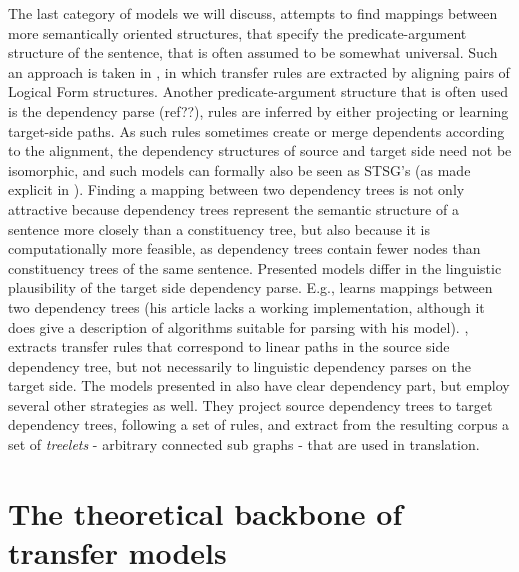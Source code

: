 \documentclass{report}
\theoremstyle{definition}
\theoremstyle{plain}
\begin{document}
The last category of models we will discuss, attempts to find mappings between more semantically oriented structures, that specify the predicate-argument structure of the sentence, that is often assumed to be somewhat universal. Such an approach is taken in \cite{menezes2003best}, in which transfer rules are extracted by aligning pairs of Logical Form structures. Another predicate-argument structure that is often used is the dependency parse (ref??), rules are inferred by either projecting or learning target-side paths. As such rules sometimes create or merge dependents according to the alignment, the dependency structures of source and target side need not be isomorphic, and such models can formally also be seen as STSG's (as made explicit in \cite{eisner2003learning}). Finding a mapping between two dependency trees is not only attractive because dependency trees represent the semantic structure of a sentence more closely than a constituency tree, but also because it is computationally more feasible, as dependency trees contain fewer nodes than constituency trees of the same sentence. Presented models differ in the linguistic plausibility of the target side dependency parse. E.g., \cite{eisner2003learning} learns mappings between two dependency trees (his article lacks a working implementation, although it does give a description of algorithms suitable for parsing with his model). \cite{lin2004path}, extracts transfer rules that correspond to linear paths in the source side dependency tree, but not necessarily to linguistic dependency parses on the target side. The models presented in \cite{quirk2005dependency,quirk2006dependency,quirk2006we} also have clear dependency part, but employ several other strategies as well. They project source dependency trees to target dependency trees, following a set of rules, and extract from the resulting corpus a set of \textit{treelets} - arbitrary connected sub graphs - that are used in translation.



%
%

\chapter{The theoretical backbone of transfer models}
\end{document}
